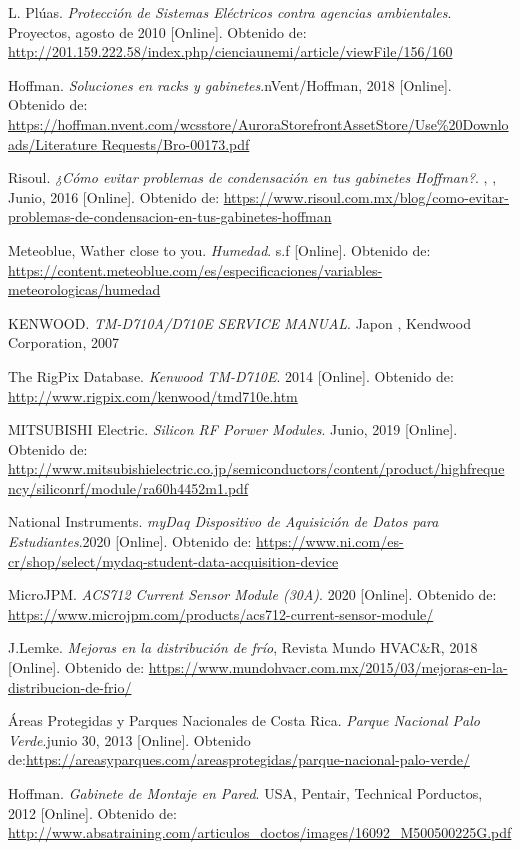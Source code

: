 \documentclass[notitlepage,oneside]{book}
\begin{document}
\begin{thebibliography}{99}
L. Plúas. \emph {Protección de Sistemas Eléctricos contra agencias  ambientales}. Proyectos, agosto de 2010 [Online]. Obtenido de: \url{http://201.159.222.58/index.php/cienciaunemi/article/viewFile/156/160}

Hoffman. \emph {Soluciones en racks y gabinetes}.nVent/Hoffman, 2018 [Online]. Obtenido de: \url{https://hoffman.nvent.com/wcsstore/AuroraStorefrontAssetStore/Use\%20Downloads/Literature Requests/Bro-00173.pdf}

Risoul. \emph {¿Cómo evitar problemas de condensación en tus gabinetes Hoffman?}. , , Junio, 2016 [Online]. Obtenido de: \url{https://www.risoul.com.mx/blog/como-evitar-problemas-de-condensacion-en-tus-gabinetes-hoffman}

Meteoblue, Wather close to you. \emph {Humedad}. s.f [Online]. Obtenido de:\url{ https://content.meteoblue.com/es/especificaciones/variables-meteorologicas/humedad}

KENWOOD. \emph {TM-D710A/D710E SERVICE MANUAL}. Japon , Kendwood Corporation, 2007

The RigPix Database. \emph {Kenwood TM-D710E}. 2014 [Online]. Obtenido de:\url{ http://www.rigpix.com/kenwood/tmd710e.htm}

MITSUBISHI Electric. \emph {Silicon RF Porwer Modules}. Junio, 2019 [Online]. Obtenido de: \url{http://www.mitsubishielectric.co.jp/semiconductors/content/product/highfrequency/siliconrf/module/ra60h4452m1.pdf}

National Instruments. \emph {myDaq Dispositivo de Aquisición de Datos para Estudiantes}.2020 [Online]. Obtenido de: \url{https://www.ni.com/es-cr/shop/select/mydaq-student-data-acquisition-device}

MicroJPM. \emph {ACS712 Current Sensor Module (30A)}. 2020 [Online]. Obtenido de: \url{https://www.microjpm.com/products/acs712-current-sensor-module/}

J.Lemke. \emph {Mejoras en la distribución de frío}, Revista Mundo HVAC\&R, 2018 [Online]. Obtenido de: \url{https://www.mundohvacr.com.mx/2015/03/mejoras-en-la-distribucion-de-frio/}

Áreas Protegidas y Parques Nacionales de Costa Rica. \emph {Parque Nacional Palo Verde}.junio 30, 2013 [Online]. Obtenido de:\url{https://areasyparques.com/areasprotegidas/parque-nacional-palo-verde/}

Hoffman. \emph {Gabinete de Montaje en Pared}. USA, Pentair, Technical Porductos, 2012 [Online]. Obtenido de: \url{http://www.absatraining.com/articulos_doctos/images/16092_M500500225G.pdf}


\end{thebibliography}
\end{document}
